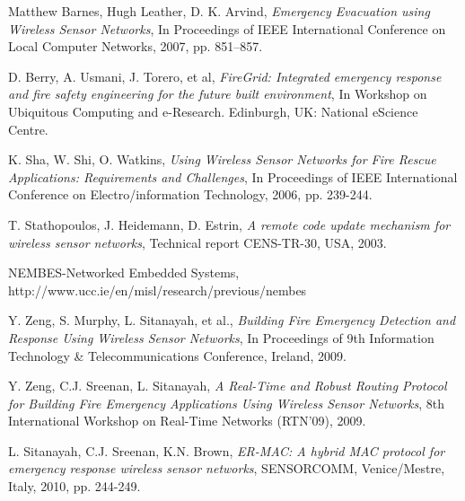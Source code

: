 \documentclass{../local}
\begin{document}
\begin{thebibliography}{9}

 Matthew Barnes, Hugh Leather, D. K. Arvind, \emph{Emergency Evacuation using Wireless Sensor Networks}, In Proceedings of IEEE International Conference on Local Computer Networks, 2007, pp. 851–857.

D. Berry, A. Usmani, J. Torero, et al, \emph{FireGrid: Integrated
emergency response and fire safety engineering for the future built environment}, In Workshop on
Ubiquitous Computing and e-Research. Edinburgh, UK: National eScience Centre.

 K. Sha, W. Shi, O. Watkins, \emph{Using Wireless Sensor Networks for Fire Rescue Applications: Requirements and Challenges}, In Proceedings of IEEE International Conference on Electro/information Technology, 2006, pp. 239-244.

 T. Stathopoulos, J. Heidemann, D. Estrin, \emph{A remote code update mechanism for wireless sensor networks}, Technical report CENS-TR-30, USA, 2003.

 NEMBES-Networked Embedded Systems,\\ http://www.ucc.ie/en/misl/research/previous/nembes

 Y. Zeng, S. Murphy, L. Sitanayah, et al., \emph{Building Fire Emergency Detection and Response Using Wireless Sensor Networks}, In Proceedings of 9th Information Technology \&  Telecommunications Conference, Ireland, 2009.

 Y. Zeng, C.J. Sreenan, L. Sitanayah, \emph{A Real-Time and Robust Routing Protocol for Building Fire Emergency Applications Using Wireless Sensor Networks}, 8th International Workshop on Real-Time Networks (RTN'09), 2009.

 L. Sitanayah, C.J. Sreenan, K.N. Brown, \emph{ER-MAC: A hybrid MAC protocol for emergency response wireless sensor networks}, SENSORCOMM, Venice/Mestre, Italy, 2010, pp. 244-249. 

\end{thebibliography}
\end{document}
